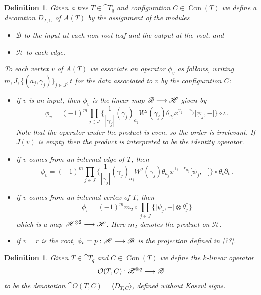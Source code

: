 \documentclass[english,letter paper,12pt,leqno]{article}
\theoremstyle{example}
\newtheorem{definition}[theorem]{Definition}
\numberwithin{equation}{section}
\def\be{\begin{equation}}
\def\ee{\end{equation}}
\begin{document}
\begin{definition} Given a tree $T \in \cat{T}_q$ and configuration $C \in \operatorname{Con}(T)$ we define a decoration $D_{T,C}$ of $A(T)$ by the assignment of the modules
\begin{itemize}
\item $\mathscr{B}$ to the input at each non-root leaf and the output at the root, and
\item $\mathscr{H}$ to each edge.
\end{itemize}
To each vertex $v$ of $A(T)$ we associate an operator $\phi_v$ as follows, writing $m, J, \{ (a_j, \gamma_j) \}_{j \in J}, t$ for the data associated to $v$ by the configuration $C$:
\begin{itemize}
\item if $v$ is an input, then $\phi_v$ is the linear map $\mathscr{B} \longrightarrow \mathscr{H}$ given by
\be\label{eq:int_input}
\phi_v = (-1)^m \prod_{j \in J}\Big\{ \frac{1}{|\gamma_j|}(\gamma_j)_{a_j} W^j( \gamma_j)  \theta_{a_j} x^{\gamma_j - e_{a_j}} \big[ \psi_j, - \big] \Big\} \circ \iota\,.
\ee
Note that the operator under the product is even, so the order is irrelevant. If $J(v)$ is empty then the product is interpreted to be the identity operator.
\item if $v$ comes from an internal edge of $T$, then
\be\label{eq:int_intedge}
\phi_v = (-1)^m \prod_{j \in J} \Big\{ \frac{1}{|\gamma_j|}(\gamma_j)_{a_j} W^j( \gamma_j)  \theta_{a_j} x^{\gamma_j - e_{a_j}} \big[ \psi_j, - \big] \Big\} \circ \theta_t \partial_t\,.
\ee
\item if $v$ comes from an internal vertex of $T$, then
\be\label{eq:int_intvert}
\phi_v = (-1)^m m_2 \circ \prod_{j \in J} \Big\{ \big[ \psi_j, - \big] \otimes \theta_j^* \Big\}
\ee
which is a map $\mathscr{H}^{\otimes 2} \longrightarrow \mathscr{H}$. Here $m_2$ denotes the product on $\mathscr{H}$.
\item if $v = r$ is the root, $\phi_v = p: \mathscr{H} \longrightarrow \mathscr{B}$ is the projection defined in \eqref{??}.
\end{itemize}
\end{definition}

\begin{definition}\label{defn:otc} Given $T \in \cat{T}_q$ and $C \in \operatorname{Con}(T)$ we define the $k$-linear operator
\[
\mathcal{O}(T, C): \mathscr{B}^{\otimes q} \longrightarrow \mathscr{B}
\]
to be the denotation $\cat{O}(T,C) = \langle D_{T,C} \rangle$, defined without Koszul signs.
\end{definition}
\end{document}
